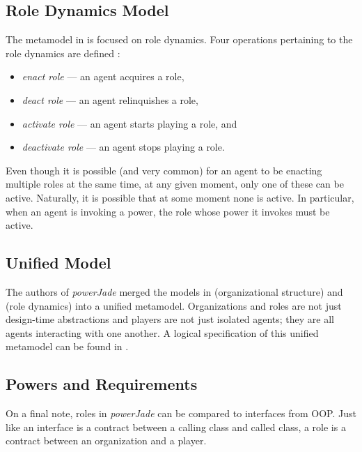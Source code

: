 \subsection*{Role Dynamics Model}

The metamodel in \cite{Dastani04} is focused on role dynamics.
Four operations pertaining to the role dynamics are defined \cite{Dastani04}:
\begin{itemize}
	\item \textit{enact role} --- an agent acquires a role,
	\item \textit{deact role} --- an agent relinquishes a role,
	\item \textit{activate role} --- an agent starts playing a role, and
	\item \textit{deactivate role} --- an agent stops playing a role.
\end{itemize}

Even though it is possible (and very common) for an agent to be enacting multiple roles at the same time, at any given moment, only one of these can be active.
Naturally, it is possible that at some moment none is active.
In particular, when an agent is invoking a power, the role whose power it invokes must be active.

\subsection*{Unified Model}

The authors of \textit{powerJade} merged the models in \cite{Boella04} (organizational structure) and \cite{Boella04} (role dynamics) into a unified metamodel.
Organizations and roles are not just design-time abstractions and players are not just isolated agents; they are all agents interacting with one another.
A logical specification of this unified metamodel can be found in \cite{Boella07}.

\subsection*{Powers and Requirements}

On a final note, roles in \textit{powerJade} can be compared to interfaces from OOP.
Just like an interface is a contract between a calling class and called class, a role is a contract between an organization and a player.

